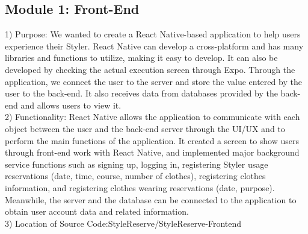 \documentclass[conference]{IEEEtran}
\begin{document}
\subsection{Module 1: Front-End}
1) Purpose: We wanted to create a React Native-based application to help users experience their Styler. React Native can develop a cross-platform and has many libraries and functions to utilize, making it easy to develop. It can also be developed by checking the actual execution screen through Expo. Through the application, we connect the user to the server and store the value entered by the user to the back-end. It also receives data from databases provided by the back-end and allows users to view it.\\

2) Functionality: React Native allows the application to communicate with each object between the user and the back-end server through the UI/UX and to perform the main functions of the application. It created a screen to show users through front-end work with React Native, and implemented major background service functions such as signing up, logging in, registering Styler usage reservations (date, time, course, number of clothes), registering clothes information, and registering clothes wearing reservations (date, purpose). Meanwhile, the server and the database can be connected to the application to obtain user account data and related information.\\

3) Location of Source Code:StyleReserve/StyleReserve-Frontend \\
\end{document}

